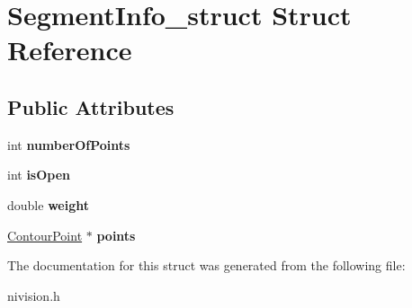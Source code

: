 \hypertarget{structSegmentInfo__struct}{
\section{SegmentInfo\_\-struct Struct Reference}
\label{structSegmentInfo__struct}
}
\subsection*{Public Attributes}
\begin{DoxyCompactItemize}
\item 
\hypertarget{structSegmentInfo__struct_af0d058226f01f4082b868d6cff43fd7b}{
int {\bfseries numberOfPoints}}
\label{structSegmentInfo__struct_af0d058226f01f4082b868d6cff43fd7b}

\item 
\hypertarget{structSegmentInfo__struct_a415d6077e8882284021405fc0df5a9ae}{
int {\bfseries isOpen}}
\label{structSegmentInfo__struct_a415d6077e8882284021405fc0df5a9ae}

\item 
\hypertarget{structSegmentInfo__struct_aa30c0a20dbea978a32ce5d4119c47010}{
double {\bfseries weight}}
\label{structSegmentInfo__struct_aa30c0a20dbea978a32ce5d4119c47010}

\item 
\hypertarget{structSegmentInfo__struct_a6c8749c4563fe27e2fd404b43e5d1348}{
\hyperlink{structContourPoint__struct}{ContourPoint} $\ast$ {\bfseries points}}
\label{structSegmentInfo__struct_a6c8749c4563fe27e2fd404b43e5d1348}

\end{DoxyCompactItemize}


The documentation for this struct was generated from the following file:\begin{DoxyCompactItemize}
\item 
nivision.h\end{DoxyCompactItemize}
